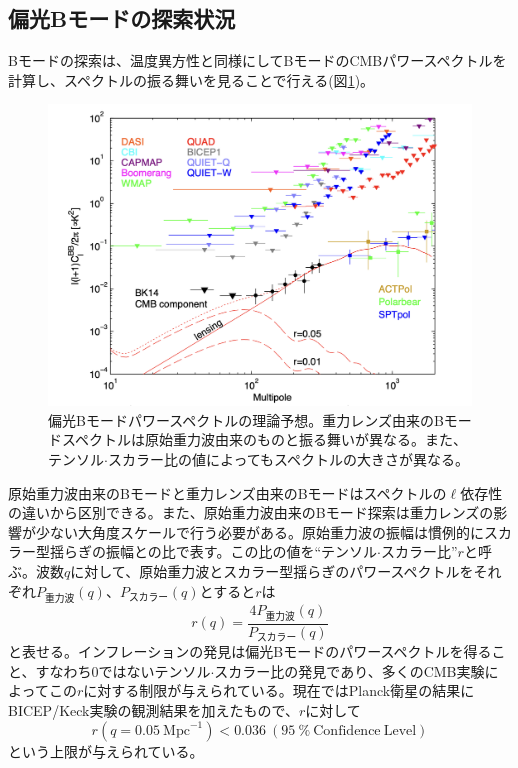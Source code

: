 \subsection{偏光Bモードの探索状況}
Bモードの探索は、温度異方性と同様にしてBモードのCMBパワースペクトルを計算し、スペクトルの振る舞いを見ることで行える(図\ref{bicep_paper})。
\begin{figure}[htbp]
  \centering
  \includegraphics[width=0.8\columnwidth]{2_cosmology/figs/bicep_ref.png}
  \caption{偏光Bモードパワースペクトルの理論予想\cite{bicep_Bmode}。重力レンズ由来のBモードスペクトルは原始重力波由来のものと振る舞いが異なる。また、テンソル$\cdot$スカラー比の値によってもスペクトルの大きさが異なる。}
  \label{bicep_paper}
\end{figure}
原始重力波由来のBモードと重力レンズ由来のBモードはスペクトルの$\ell$依存性の違いから区別できる。また、原始重力波由来のBモード探索は重力レンズの影響が少ない大角度スケールで行う必要がある。原始重力波の振幅は慣例的にスカラー型揺らぎの振幅との比で表す。この比の値を``テンソル$\cdot$スカラー比''$r$と呼ぶ。波数$q$に対して、原始重力波とスカラー型揺らぎのパワースペクトルをそれぞれ$P_{重力波}(q)$、$P_{スカラー}(q)$とすると$r$は
\begin{equation}
  r(q) = \frac{4P_{重力波}(q)}{P_{スカラー}(q)}
\end{equation}
と表せる。インフレーションの発見は偏光Bモードのパワースペクトルを得ること、すなわち0ではないテンソル$\cdot$スカラー比の発見であり、多くのCMB実験によってこの$r$に対する制限が与えられている。現在ではPlanck衛星の結果にBICEP/Keck実験の観測結果を加えたもので、$r$に対して
\begin{equation}
  r(q=\SI{0.05}{\mathrm{Mpc}^{-1}}) < 0.036 ~ (\SI{95}{\%} ~\mathrm{Confidence~Level})
\end{equation}
という上限が与えられている\cite{const_r}。
